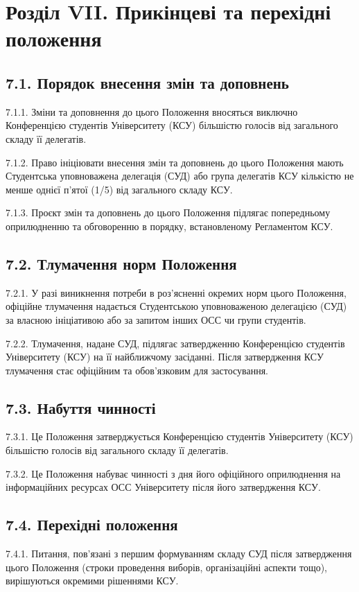 \section*{Розділ VII. Прикінцеві та перехідні положення}

\subsection*{7.1. Порядок внесення змін та доповнень}
    7.1.1. Зміни та доповнення до цього Положення вносяться виключно Конференцією студентів Університету (КСУ) більшістю голосів від загального складу її делегатів.

    7.1.2. Право ініціювати внесення змін та доповнень до цього Положення мають Студентська уповноважена делегація (СУД) або група делегатів КСУ кількістю не менше однієї п'ятої (1/5) від загального складу КСУ.

    7.1.3. Проєкт змін та доповнень до цього Положення підлягає попередньому оприлюдненню та обговоренню в порядку, встановленому Регламентом КСУ.

\subsection*{7.2. Тлумачення норм Положення}
    7.2.1. У разі виникнення потреби в роз'ясненні окремих норм цього Положення, офіційне тлумачення надається Студентською уповноваженою делегацією (СУД) за власною ініціативою або за запитом інших ОСС чи групи студентів.

    7.2.2. Тлумачення, надане СУД, підлягає затвердженню Конференцією студентів Університету (КСУ) на її найближчому засіданні. Після затвердження КСУ тлумачення стає офіційним та обов'язковим для застосування.

\subsection*{7.3. Набуття чинності}
    7.3.1. Це Положення затверджується Конференцією студентів Університету (КСУ) більшістю голосів від загального складу її делегатів.

    7.3.2. Це Положення набуває чинності з дня його офіційного оприлюднення на інформаційних ресурсах ОСС Університету після його затвердження КСУ.

\subsection*{7.4. Перехідні положення}
    7.4.1. Питання, пов'язані з першим формуванням складу СУД після затвердження цього Положення (строки проведення виборів, організаційні аспекти тощо), вирішуються окремими рішеннями КСУ. 
